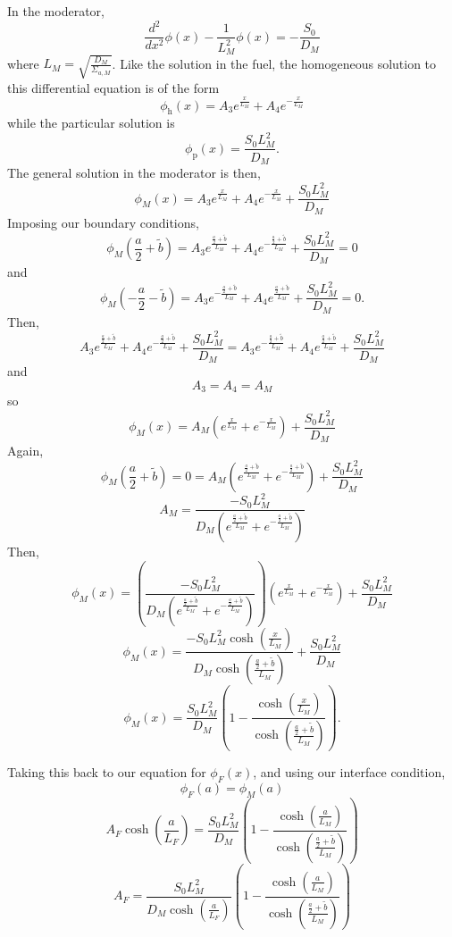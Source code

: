 \documentclass{article}
\newcommand{\Xs}{\Sigma}
\begin{document}
In the moderator,
$$ \frac{d^2}{dx^2}\phi(x) - \frac{1}{L_M^2}\phi(x) = -\frac{S_0}{D_M} $$
where $L_M = \sqrt{\frac{D_M}{\Xs_{a,M}}}$. Like the solution in the fuel, the homogeneous solution to this differential equation is of the form
$$ \phi_{\text{h}}(x) = A_3 e^{\frac{x}{L_M}} + A_4 e^{-\frac{x}{L_M}} $$
while the particular solution is
$$ \phi_{\text{p}}(x) = \frac{S_0 L_M^2}{D_M} .$$
The general solution in the moderator is then,
$$ \phi_M(x) = A_3 e^{\frac{x}{L_M}} + A_4 e^{-\frac{x}{L_M}} + \frac{S_0 L_M^2}{D_M} $$
Imposing our boundary conditions,
$$ \phi_M(\frac{a}{2}+\tilde{b}) = A_3 e^{\frac{\frac{a}{2}+\tilde{b}}{L_M}} + A_4 e^{-\frac{\frac{a}{2}+\tilde{b}}{L_M}} + \frac{S_0 L_M^2}{D_M} = 0 $$
and 
$$ \phi_M(-\frac{a}{2}-\tilde{b}) = A_3 e^{-\frac{\frac{a}{2}+\tilde{b}}{L_M}} + A_4 e^{\frac{\frac{a}{2}+\tilde{b}}{L_M}} + \frac{S_0 L_M^2}{D_M} = 0 .$$
Then,
$$ A_3 e^{\frac{\frac{a}{2}+\tilde{b}}{L_M}} + A_4 e^{-\frac{\frac{a}{2}+\tilde{b}}{L_M}} + \frac{S_0 L_M^2}{D_M} = A_3 e^{-\frac{\frac{a}{2}+\tilde{b}}{L_M}} + A_4 e^{\frac{\frac{a}{2}+\tilde{b}}{L_M}} + \frac{S_0 L_M^2}{D_M} $$
and
$$ A_3 = A_4 = A_M$$
so
$$ \phi_M(x) = A_M \left( e^{\frac{x}{L_M}} + e^{-\frac{x}{L_M}} \right) + \frac{S_0 L_M^2}{D_M} $$
Again, 
$$ \phi_M(\frac{a}{2}+\tilde{b}) = 0 = A_M \left( e^{\frac{\frac{a}{2}+\tilde{b}}{L_M}} + e^{-\frac{\frac{a}{2}+\tilde{b}}{L_M}} \right) + \frac{S_0 L_M^2}{D_M}$$
$$ A_M = \frac{-S_0 L_M^2}{D_M \left( e^{\frac{\frac{a}{2}+\tilde{b}}{L_M}} + e^{-\frac{\frac{a}{2}+\tilde{b}}{L_M}}\right)} $$
Then,
$$ \phi_M(x) = \left(\frac{-S_0 L_M^2}{D_M \left( e^{\frac{\frac{a}{2}+\tilde{b}}{L_M}} + e^{-\frac{\frac{a}{2}+\tilde{b}}{L_M}}\right)}\right) \left( e^{\frac{x}{L_M}} + e^{-\frac{x}{L_M}} \right) + \frac{S_0 L_M^2}{D_M} $$
$$ \phi_M(x) = \frac{-S_0 L_M^2 \cosh\left(\frac{x}{L_M}\right)}{D_M \cosh\left(\frac{\frac{a}{2}+\tilde{b}}{L_M}\right)} + \frac{S_0 L_M^2}{D_M} $$
$$\boxed{ \phi_M(x) = \frac{S_0 L_M^2}{D_M}\left( 1 - \frac{\cosh\left(\frac{x}{L_M}\right)}{\cosh\left(\frac{\frac{a}{2}+\tilde{b}}{L_M}\right)}\right) }.$$

Taking this back to our equation for $\phi_F(x)$, and using our interface condition,
$$ \phi_F(a) = \phi_M(a) $$
$$ A_F \cosh\left(\frac{a}{L_F}\right) = \frac{S_0 L_M^2}{D_M}\left( 1 - \frac{\cosh\left(\frac{a}{L_M}\right)}{\cosh\left(\frac{\frac{a}{2}+\tilde{b}}{L_M}\right)}\right) $$
$$ A_F = \frac{S_0 L_M^2}{D_M \cosh\left(\frac{a}{L_F}\right)}\left( 1 - \frac{\cosh\left(\frac{a}{L_M}\right)}{\cosh\left(\frac{\frac{a}{2}+\tilde{b}}{L_M}\right)}\right) $$
\end{document}
